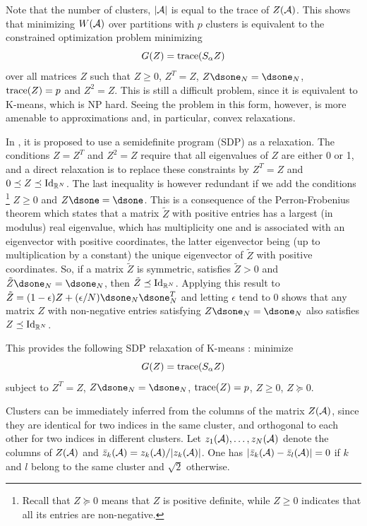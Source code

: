 Note that the number of clusters, $|{\mathcal A}|$ is equal to the trace of $Z({\mathcal A})$.
This shows that minimizing $W({\mathcal A})$ over partitions with $p$ clusters is equivalent to the constrained optimization problem minimizing
\begin{equation}
\label{eq:kmeans.matrix}
G(Z) = {\mathrm{trace}}(S_\alpha Z)
\end{equation}
over all matrices $Z$ such that $Z\geq 0$, $Z^T = Z$, $Z \dsone_N = \dsone_N$, ${\mathrm{trace}}(Z) = p$ and $Z^2 = Z$. This is still a difficult problem, since it is equivalent to K-means, which is NP hard. Seeing the problem in this form, however, is more amenable to approximations and, in particular, convex relaxations.
 
 
In \citep{peng2007approximating}, it is proposed to use a semidefinite program (SDP) as a relaxation. The conditions $Z = Z^T$ and $Z^2=Z$ require that all eigenvalues of $Z$ are either 0 or 1, and a direct relaxation is to replace these constraints by $Z^T = Z$ and $0 \preceq Z \preceq \Id[N]$.  The last inequality is however redundant if we add the conditions
\footnote{Recall that $Z\succeq 0$ means that $Z$ is positive definite, while $Z\geq 0$ indicates that all its entries are non-negative.}
 $Z \geq 0$ and $Z\dsone = \dsone$. This is a consequence of the Perron-Frobenius theorem which states that a matrix $\tilde Z$ with positive entries has a largest (in modulus) real eigenvalue, which has multiplicity one and is associated with an eigenvector with positive coordinates, the latter eigenvector being (up to multiplication by a constant) the unique eigenvector of $\tilde Z$ with positive coordinates. So, if a matrix $\tilde Z$ is symmetric, satisfies $\tilde Z > 0$ and $\tilde Z \dsone_N = \dsone_N$, then $\tilde Z \preceq \Id[N]$. Applying this result to $\tilde Z = (1-\epsilon) Z + (\epsilon/N) \dsone_N\dsone_N^T$ and letting $\epsilon$ tend to 0 shows that any matrix $Z$ with non-negative entries satisfying $Z\dsone_N = \dsone_N$ also satisfies $Z\preceq \Id[N]$.
 
This provides the following SDP relaxation of K-means \citep{peng2007approximating}: minimize  
\begin{equation}
\label{eq:kmeans.matrix.2}
G(Z) = {\mathrm{trace}}(S_\alpha Z)
\end{equation}
subject to $Z^T = Z$, $Z \dsone_N = \dsone_N$, ${\mathrm{trace}}(Z) = p$, $Z\geq 0$, $Z\succeq 0$.

Clusters can be immediately inferred from the columns of the matrix $Z({\mathcal A})$, since they are identical for two indices in the same cluster, and orthogonal to each other for two indices in different clusters. Let $z_1({\mathcal A}), \ldots, z_N({\mathcal A})$ denote the columns of $Z({\mathcal A})$ and  $\bar z_k({\mathcal A}) = z_k({\mathcal A})/|z_k({\mathcal A})|$. One has $|\bar z_k({\mathcal A}) - \bar z_l({\mathcal A})|= 0$ if $k$ and $l$ belong to the same cluster and $\sqrt 2$ otherwise. 

